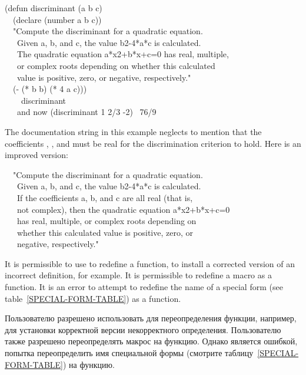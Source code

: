 \begin{defmac}
\begin{lisp}
(defun discriminant (a b c) \\
~~(declare (number a b c)) \\
~~"Compute the discriminant for a quadratic equation. \\
~~~Given a, b, and c, the value b{\Xcircumflex}2-4*a*c is calculated. \\
~~~The quadratic equation a*x{\Xcircumflex}2+b*x+c=0 has real, multiple, \\
~~~or complex roots depending on whether this calculated \\
~~~value is positive, zero, or negative, respectively." \\
~~(- (* b b) (* 4 a c))) \\
~~~\EV\ discriminant \\
~~~\textrm{and now} (discriminant 1 2/3 -2) \EV\ 76/9
\end{lisp}
\begin{new}%
The documentation string in this example neglects to mention that the
coefficients , , and 
must be real for the discrimination criterion to hold.
Here is an improved version:
\begin{lisp}
~~"Compute the discriminant for a quadratic equation. \\
~~~Given a, b, and c, the value b{\Xcircumflex}2-4*a*c is calculated. \\
~~~If the coefficients a, b, and c are all real (that is, \\
~~~not complex), then the quadratic equation a*x{\Xcircumflex}2+b*x+c=0 \\
~~~has real, multiple, or complex roots depending on \\
~~~whether this calculated value is positive, zero, or \\
~~~negative, respectively."
\end{lisp}
\end{new}

It is permissible to use  to redefine a function,
to install a corrected version of an incorrect definition, for example.
It is permissible to redefine a macro as a function.
It is an error to attempt to redefine the name of a special
form (see table~\ref{SPECIAL-FORM-TABLE}) as a function.

Пользователю разрешено использовать  для переопределения функции, например, для
установки корректной версии некорректного определения.
Пользователю также разрешено переопределять макрос на функцию.
Однако является ошибкой, попытка переопределить имя специальной формы (смотрите
таблицу~\ref{SPECIAL-FORM-TABLE}) на функцию.
\end{defmac}

